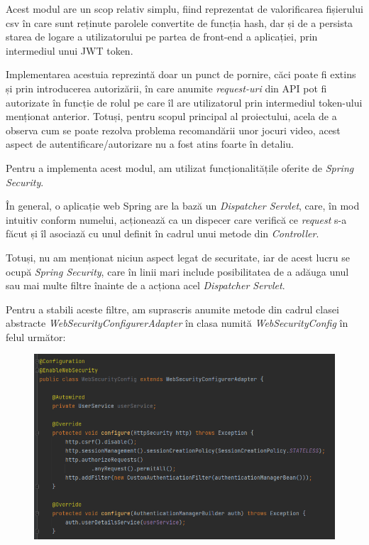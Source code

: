 \documentclass[12pt,a4paper]{report}
\begin{document}
   Acest modul are un scop relativ simplu, fiind reprezentat de valorificarea fișierului csv în care sunt reținute parolele convertite de funcția hash, dar și de a persista starea de logare a utilizatorului pe partea de front-end a aplicației, prin intermediul unui JWT token. \cite{24}

Implementarea acestuia reprezintă doar un punct de pornire, căci poate fi extins și prin introducerea autorizării, în care anumite \emph{request-uri} din API pot fi autorizate în funcție de rolul pe care îl are utilizatorul prin intermediul token-ului menționat anterior. Totuși, pentru scopul principal al proiectului, acela de a observa cum se poate rezolva problema recomandării unor jocuri video, acest aspect de autentificare/autorizare nu a fost atins foarte în detaliu.

Pentru a implementa acest modul, am utilizat funcționalitățile oferite de \emph{Spring Security}. \cite{25}

În general, o aplicație web Spring are la bază un \emph{Dispatcher Servlet}, care, în mod intuitiv conform numelui, acționează ca un dispecer care verifică ce \emph{request} s-a făcut și îl asociază cu unul definit în cadrul unui metode din \emph{Controller}. \cite{26}

Totuși, nu am menționat niciun aspect legat de securitate, iar de acest lucru se ocupă \emph{Spring Security}, care în linii mari include posibilitatea de a adăuga unul sau mai multe filtre înainte de a acționa acel \emph{Dispatcher Servlet}.

Pentru a stabili aceste filtre, am suprascris anumite metode din cadrul clasei abstracte \emph{WebSecurityConfigurerAdapter} în clasa numită \emph{WebSecurityConfig} în felul următor:

\begin{figure}[H]
\centering
\caption{}
\includegraphics[scale = 0.7]{exemplu_23_security}
\caption*{}
\end{figure}
\end{document}

